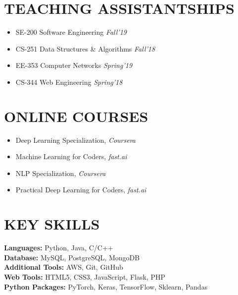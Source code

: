 \documentclass[11pt,letterpaper,roman]{moderncv}        %
\begin{document}
\section{TEACHING ASSISTANTSHIPS}
\begin{minipage}{\maincolumnwidth}
\small{
  \begin{multicols}{2}
    \begin{itemize}
      \item SE-200 Software Engineering \textit{Fall'19} 
      \item CS-251 Data Structures \& Algorithms \textit{Fall'18}
      \item EE-353 Computer Networks \textit{Spring'19}
      \item CS-344 Web Engineering \textit{Spring'18}
    \end{itemize}
  \end{multicols}}
\end{minipage}
\vspace*{-4mm}

\section{ONLINE COURSES}
\begin{minipage}{\maincolumnwidth}
\small{
  \begin{multicols}{2}
    \begin{itemize}
      \item Deep Learning Specialization, \textit{Coursera} 
      \item Machine Learning for Coders,\textit{ fast.ai}
      \item NLP Specialization,\textit{ Coursera}
      \item Practical Deep Learning for Coders,\textit{ fast.ai}
    \end{itemize}
  \end{multicols}}
\end{minipage}
\vspace*{-4mm}

\section{KEY SKILLS}
{\bfseries Languages:} Python, Java, C/C++ \\
{\bfseries Database:} MySQL, PostgreSQL, MongoDB \\
{\bfseries Additional Tools:} AWS, Git, GitHub \\
{\bfseries Web Tools:} HTML5, CSS3, JavaScript, Flask, PHP \\
{\bfseries Python Packages:} PyTorch, Keras, TensorFlow, Sklearn, Pandas
\end{document}
